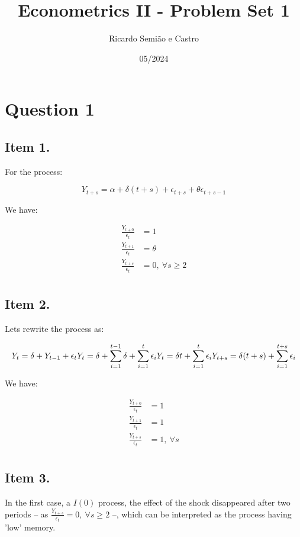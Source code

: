 \documentclass[12pt]{article}
\title{Econometrics II - Problem Set 1}
\author{Ricardo Semião e Castro}
\date{05/2024}
\begin{document}
\maketitle


\section*{Question 1}

\subsection*{Item 1.}
For the process:

$$
Y_{t+s} = \alpha + \delta(t+s) + \epsilon_{t+s} + \theta \epsilon_{t+s-1}
$$

We have:

\begin{align*}
    \frac{Y_{t+0}}{\epsilon_{t}} &= 1\\
    \frac{Y_{t+1}}{\epsilon_{t}} &= \theta\\
    \frac{Y_{t+s}}{\epsilon_{t}} &= 0,~ \forall s \geq 2\\
\end{align*}


\subsection*{Item 2.}

Lets rewrite the process as:

$$
Y_{t} = \delta + Y_{t-1} + \epsilon_{t}\\
Y_{t} = \delta + \sum_{i=1}^{t-1}\delta + \sum_{i=1}^{t}\epsilon_{i}\\
Y_{t} = \delta t + \sum_{i=1}^{t}\epsilon_{i}\\
Y_{t+s} = \delta (t+s) + \sum_{i=1}^{t+s}\epsilon_{i}
$$

We have:

\begin{align*}
    \frac{Y_{t+0}}{\epsilon_{t}} &= 1\\
    \frac{Y_{t+1}}{\epsilon_{t}} &= 1\\
    \frac{Y_{t+s}}{\epsilon_{t}} &= 1,~ \forall s\\
\end{align*}


\subsection*{Item 3.}
In the first case, a $I(0)$ process, the effect of the shock disappeared after two periods -- as $\frac{Y_{t+s}}{\epsilon_{t}} = 0,~ \forall s \geq 2$ --, which can be interpreted as the process having 'low' memory.
\end{document}
